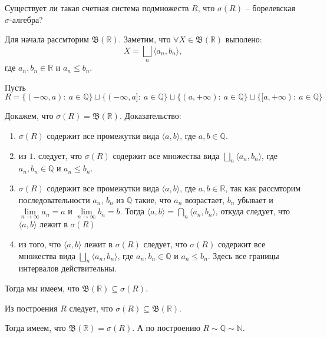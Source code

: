 \begin{task}{10}
Существует ли такая счетная система подмножеств $R$, что $\sigma (R)$ -- борелевская $\sigma$-алгебра?
\end{task}

\begin{solution}
Для начала рассмторим $\mathfrak{B}\left(\mathbb{R}\right)$. Заметим, что $\forall X \in \mathfrak{B}\left(\mathbb{R}\right)$ выполено: \[ X = \underset{n}{\bigsqcup} \langle a_n, b_n \rangle,\] где $a_n, b_n \in \mathbb{R}$ и $a_n \leq b_n$.

Пусть $R = \lbrace (-\infty, a) : ~ a \in \mathbb{Q} \rbrace \sqcup \lbrace (-\infty, a] : ~ a \in \mathbb{Q} \rbrace \sqcup \lbrace (a, +\infty ) : ~ a \in \mathbb{Q} \rbrace \sqcup \lbrace [a, +\infty ) : ~ a \in \mathbb{Q} \rbrace$

Докажем, что $\sigma (R) = \mathfrak{B}(\mathbb{R})$.
Доказательство:
\begin{enumerate}
    \item $\sigma (R)$ содержит все промежутки вида $\langle a, b \rangle$, где $a, b \in \mathbb{Q}$.
    
    \item из $1.$ следует, что $\sigma (R)$ содержит все множества вида $\underset{n}{\bigsqcup} \langle a_n, b_n \rangle$, где $a_n, b_n \in \mathbb{Q}$ и $a_n \leq b_n$.
    
    \item $\sigma (R)$ содержит все промежутки вида $\langle a, b \rangle$, где $a, b \in \mathbb{R}$, так как рассмторим последовательности ${a_n}$, ${b_n}$ из $\mathbb{Q}$ такие, что ${a_n}$ возрастает, ${b_n}$ убывает и $\underset{n\to\infty}{\lim} a_n = a$ и $\underset{n\to\infty}{\lim} b_n = b$. Тогда $\langle a, b \rangle = \underset{n}{\bigcap} \langle a_n, b_n \rangle$, откуда следует, что $\langle a, b \rangle$ лежит в $\sigma (R)$
    
    \item из того, что $\langle a, b \rangle$ лежит в $\sigma (R)$ следует, что $\sigma (R)$ содержит все множества вида $\underset{n}{\bigsqcup} \langle a_n, b_n \rangle$, где $a_n, b_n \in \mathbb{Q}$ и $a_n \leq b_n$. Здесь все границы интервалов действительны.
\end{enumerate}

Тогда мы имеем, что $\mathfrak{B}(\mathbb{R}) \subseteq \sigma(R)$.

Из построения $R$ следует, что $\sigma (R) \subseteq \mathfrak{B}(\mathbb{R})$.

Тогда имеем, что $\mathfrak{B}(\mathbb{R}) = \sigma(R)$. А по построению $R \sim \mathbb{Q} \sim \mathbb{N}$.
\end{solution}
